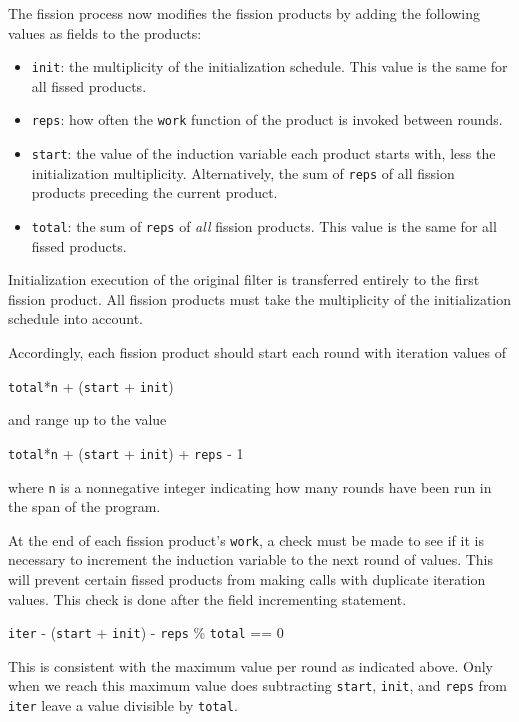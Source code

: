 The fission process now modifies the fission products by adding the
following values as fields to the products:
\begin{itemize}
    \item \texttt{init}: the multiplicity of the initialization schedule.  This value is the same for all fissed products.
    \item \texttt{reps}: how often the \texttt{work} function of the product is
      invoked between rounds.
    \item \texttt{start}: the value of the induction variable each product starts with, less the initialization multiplicity.  Alternatively, the sum of {\tt reps} of all fission products preceding the current product.
    \item \texttt{total}: the sum of {\tt reps} of {\it all} fission products. This value is
      the same for all fissed products.
\end{itemize}
Initialization execution of the original filter is transferred entirely to the first fission product.  All fission products must take the multiplicity of the initialization schedule into account.  

Accordingly, each fission product should start each round with iteration values
of
\begin{center}
\texttt{total}*\texttt{n} + (\texttt{start} + \texttt{init})
\end{center}
and range up to the value
\begin{center}
\texttt{total}*\texttt{n} + (\texttt{start} + \texttt{init}) + \texttt{reps} - 1
\end{center}
where \texttt{n} is a nonnegative integer indicating how many rounds have
been run in the span of the program.  

At the end of each fission product's \texttt{work}, a check must be made to see if it is necessary to increment the induction variable to the next round of values.  This will prevent certain fissed products from making calls with duplicate iteration values.  This check is done after the field incrementing statement.
\begin{center}
\texttt{iter} - (\texttt{start} + \texttt{init}) - \texttt{reps} \% \texttt{total} == 0
\end{center}
This is consistent with the maximum value per round as
indicated above.  Only when we reach this maximum value does subtracting 
\texttt{start}, \texttt{init}, and \texttt{reps} from \texttt{iter} leave a value divisible by
\texttt{total}.

